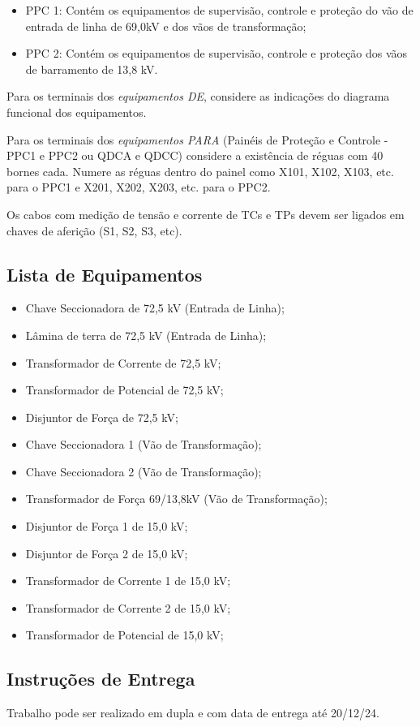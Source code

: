 \begin{itemize}
\tightlist
\item
  PPC 1: Contém os equipamentos de supervisão, controle e proteção do
  vão de entrada de linha de 69,0kV e dos vãos de transformação;
\item
  PPC 2: Contém os equipamentos de supervisão, controle e proteção dos
  vãos de barramento de 13,8 kV.
\end{itemize}

Para os terminais dos \emph{equipamentos DE}, considere as indicações do
diagrama funcional dos equipamentos.

Para os terminais dos \emph{equipamentos PARA} (Painéis de Proteção e
Controle - PPC1 e PPC2 ou QDCA e QDCC) considere a existência de réguas
com 40 bornes cada. Numere as réguas dentro do painel como X101, X102,
X103, etc. para o PPC1 e X201, X202, X203, etc. para o PPC2.

Os cabos com medição de tensão e corrente de TCs e TPs devem ser ligados
em chaves de aferição (S1, S2, S3, etc).

\hypertarget{lista-de-equipamentos}{%
\subsection{Lista de Equipamentos}\label{lista-de-equipamentos}}

\begin{itemize}
\tightlist
\item
  Chave Seccionadora de 72,5 kV (Entrada de Linha);
\item
  Lâmina de terra de 72,5 kV (Entrada de Linha);
\item
  Transformador de Corrente de 72,5 kV;
\item
  Transformador de Potencial de 72,5 kV;
\item
  Disjuntor de Força de 72,5 kV;
\item
  Chave Seccionadora 1 (Vão de Transformação);
\item
  Chave Seccionadora 2 (Vão de Transformação);
\item
  Transformador de Força 69/13,8kV (Vão de Transformação);
\item
  Disjuntor de Força 1 de 15,0 kV;
\item
  Disjuntor de Força 2 de 15,0 kV;
\item
  Transformador de Corrente 1 de 15,0 kV;
\item
  Transformador de Corrente 2 de 15,0 kV;
\item
  Transformador de Potencial de 15,0 kV;
\end{itemize}

\hypertarget{instruuxe7uxf5es-de-entrega}{%
\subsection{Instruções de Entrega}\label{instruuxe7uxf5es-de-entrega}}

Trabalho pode ser realizado em dupla e com data de entrega até 20/12/24.
